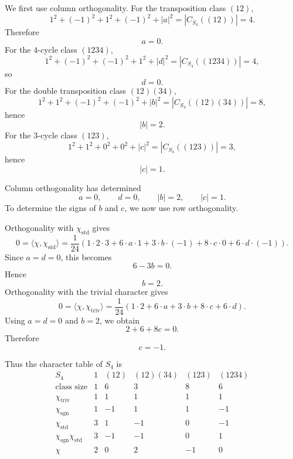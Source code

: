 \begin{example}
    We first use column orthogonality. For the transposition class \((12)\),
    \[
        1^2+(-1)^2+1^2+(-1)^2+|a|^2
        =
        |C_{S_4}((12))|
        =
        4.
    \]
    Therefore
    \[
        a=0.
    \]
    For the \(4\)-cycle class \((1234)\),
    \[
        1^2+(-1)^2+(-1)^2+1^2+|d|^2
        =
        |C_{S_4}((1234))|
        =
        4,
    \]
    so
    \[
        d=0.
    \]
    For the double transposition class \((12)(34)\),
    \[
        1^2+1^2+(-1)^2+(-1)^2+|b|^2
        =
        |C_{S_4}((12)(34))|
        =
        8,
    \]
    hence
    \[
        |b|=2.
    \]
    For the \(3\)-cycle class \((123)\),
    \[
        1^2+1^2+0^2+0^2+|c|^2
        =
        |C_{S_4}((123))|
        =
        3,
    \]
    hence
    \[
        |c|=1.
    \]

    Column orthogonality has determined
    \[
        a=0,\qquad d=0,\qquad |b|=2,\qquad |c|=1.
    \]
    To determine the signs of \(b\) and \(c\), we now use row orthogonality.

    Orthogonality with \(\chi_{\mathrm{std}}\) gives
    \[
        0
        =
        \langle \chi,\chi_{\mathrm{std}}\rangle
        =
        \frac{1}{24}
        \left(
            1\cdot 2\cdot 3
            +
            6\cdot a\cdot 1
            +
            3\cdot b\cdot (-1)
            +
            8\cdot c\cdot 0
            +
            6\cdot d\cdot (-1)
        \right).
    \]
    Since \(a=d=0\), this becomes
    \[
        6-3b=0.
    \]
    Hence
    \[
        b=2.
    \]
    Orthogonality with the trivial character gives
    \[
        0
        =
        \langle \chi,\chi_{\mathrm{triv}}\rangle
        =
        \frac{1}{24}
        \left(
            1\cdot 2
            +
            6\cdot a
            +
            3\cdot b
            +
            8\cdot c
            +
            6\cdot d
        \right).
    \]
    Using \(a=d=0\) and \(b=2\), we obtain
    \[
        2+6+8c=0.
    \]
    Therefore
    \[
        c=-1.
    \]

    Thus the character table of \(S_4\) is
    \[
        \begin{array}{c|ccccc}
            S_4
            & 1 & (12) & (12)(34) & (123) & (1234)\\
            \hline
            \text{class size}
            & 1 & 6 & 3 & 8 & 6\\
            \hline
            \chi_{\mathrm{triv}}
            & 1 & 1 & 1 & 1 & 1\\
            \chi_{\mathrm{sgn}}
            & 1 & -1 & 1 & 1 & -1\\
            \chi_{\mathrm{std}}
            & 3 & 1 & -1 & 0 & -1\\
            \chi_{\mathrm{sgn}}\chi_{\mathrm{std}}
            & 3 & -1 & -1 & 0 & 1\\
            \chi
            & 2 & 0 & 2 & -1 & 0
        \end{array}
    \]
\end{example}
